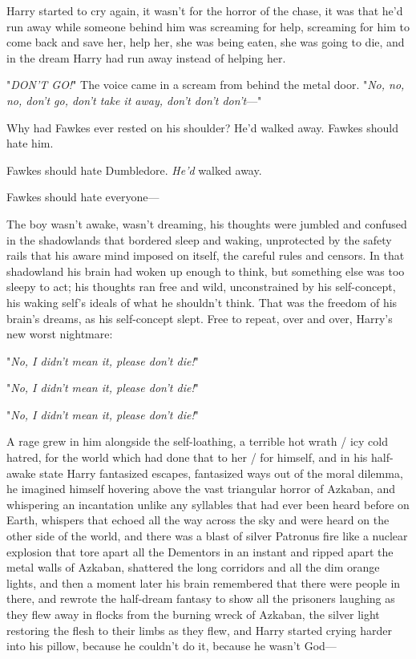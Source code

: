 Harry started to cry again, it wasn't for the horror of the chase, it was that
he'd run away while someone behind him was screaming for help, screaming for
him to come back and save her, help her, she was being eaten, she was going to
die, and in the dream Harry had run away instead of helping her.

"\emph{DON'T GO!}" The voice came in a scream from behind the metal door. "\emph{No,
no, no, don't go, don't take it away, don't don't don't}\mbox{---}"

Why had Fawkes ever rested on his shoulder? He'd walked away. Fawkes should
hate him.

Fawkes should hate Dumbledore. \emph{He'd} walked away.

Fawkes should hate everyone---

The boy wasn't awake, wasn't dreaming, his thoughts were jumbled and confused
in the shadowlands that bordered sleep and waking, unprotected by the safety
rails that his aware mind imposed on itself, the careful rules and censors. In
that shadowland his brain had woken up enough to think, but something else was
too sleepy to act; his thoughts ran free and wild, unconstrained by his
self-concept, his waking self's ideals of what he shouldn't think. That was the
freedom of his brain's dreams, as his self-concept slept. Free to repeat, over
and over, Harry's new worst nightmare:

"\emph{No, I didn't mean it, please don't die!}"

"\emph{No, I didn't mean it, please don't die!}"

"\emph{No, I didn't mean it, please don't die!}"

A rage grew in him alongside the self-loathing, a terrible hot wrath / icy cold
hatred, for the world which had done that to her / for himself, and in his
half-awake state Harry fantasized escapes, fantasized ways out of the moral
dilemma, he imagined himself hovering above the vast triangular horror of
Azkaban, and whispering an incantation unlike any syllables that had ever been
heard before on Earth, whispers that echoed all the way across the sky and were
heard on the other side of the world, and there was a blast of silver Patronus
fire like a nuclear explosion that tore apart all the Dementors in an instant
and ripped apart the metal walls of Azkaban, shattered the long corridors and
all the dim orange lights, and then a moment later his brain remembered that
there were people in there, and rewrote the half-dream fantasy to show all the
prisoners laughing as they flew away in flocks from the burning wreck of
Azkaban, the silver light restoring the flesh to their limbs as they flew, and
Harry started crying harder into his pillow, because he couldn't do it, because
he wasn't God---

